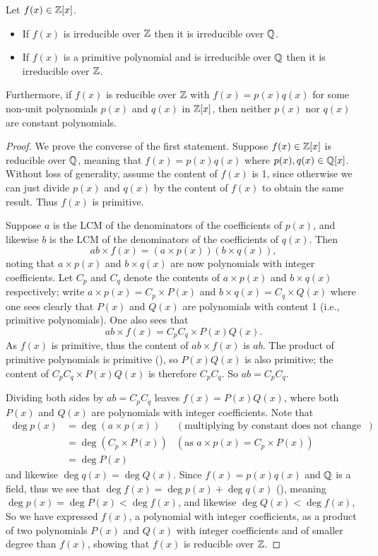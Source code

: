 \begin{theorem}\label{thrm-irreducible-over-Z-means-irreducible-over-Q}
    Let $f(x) \in \mathbb{Z}[x]$.
    \begin{itemize}
        \item If $f(x)$ is irreducible over $\mathbb{Z}$ then it is irreducible over $\mathbb{Q}$.
        \item If $f(x)$ is a primitive polynomial and is irreducible over $\mathbb{Q}$ then it is irreducible over $\mathbb{Z}$.
    \end{itemize}
    Furthermore, if $f(x)$ is reducible over $\mathbb{Z}$ with $f(x) = p(x)q(x)$ for some non-unit polynomials $p(x)$ and $q(x)$ in $\mathbb{Z}[x]$, then neither $p(x)$ nor $q(x)$ are constant polynomials.
\end{theorem}
\begin{proof}
    We prove the converse of the first statement. Suppose $f(x) \in \mathbb{Z}[x]$ is reducible over $\mathbb{Q}$, meaning that $f(x) = p(x)q(x)$ where $p(x), q(x) \in \mathbb{Q}[x]$. Without loss of generality, assume the content of $f(x)$ is 1, since otherwise we can just divide $p(x)$ and $q(x)$ by the content of $f(x)$ to obtain the same result. Thus $f(x)$ is primitive.

    Suppose $a$ is the LCM of the denominators of the coefficients of $p(x)$, and likewise $b$ is the LCM of the denominators of the coefficients of $q(x)$. Then
    \[
        ab\times f(x) = (a\times p(x))(b\times q(x)),
    \]
    noting that $a\times p(x)$ and $b\times q(x)$ are now polynomials with integer coefficients. Let $C_p$ and $C_q$ denote the contents of $a \times p(x)$ and $b \times q(x)$ respectively; write $a\times p(x) = C_p\times P(x)$ and $b \times q(x) = C_q\times Q(x)$ where one sees clearly that $P(x)$ and $Q(x)$ are polynomials with content 1 (i.e., primitive polynomials). One also sees that
    \[
        ab \times f(x) = C_pC_q \times P(x)Q(x).
    \]
    As $f(x)$ is primitive, thus the content of $ab \times f(x)$ is $ab$. The product of primitive polynomials is primitive (), so $P(x)Q(x)$ is also primitive; the content of $C_pC_q \times P(x)Q(x)$ is therefore $C_pC_q$. So $ab = C_pC_q$.
    
    Dividing both sides by $ab = C_pC_q$ leaves $f(x) = P(x)Q(x)$, where both $P(x)$ and $Q(x)$ are polynomials with integer coefficients. Note that
    \begin{align*}
        \deg p(x) &= \deg (a\times p(x)) & (\text{multiplying by constant does not change degree})\\
        &= \deg(C_p\times P(x)) & (\text{as } a\times p(x) = C_p\times P(x))\\
        &= \deg P(x)
    \end{align*}
    and likewise $\deg q(x) = \deg Q(x)$. Since $f(x) = p(x)q(x)$ and $\mathbb{Q}$ is a field, thus we see that $\deg f(x) = \deg p(x) + \deg q(x)$ (), meaning $\deg p(x) = \deg P(x) < \deg f(x)$, and likewise $\deg Q(x) < \deg f(x)$, So we have expressed $f(x)$, a polynomial with integer coefficients, as a product of two polynomials $P(x)$ and $Q(x)$ with integer coefficients and of smaller degree than $f(x)$, showing that $f(x)$ is reducible over $\mathbb{Z}$.


\end{proof}

